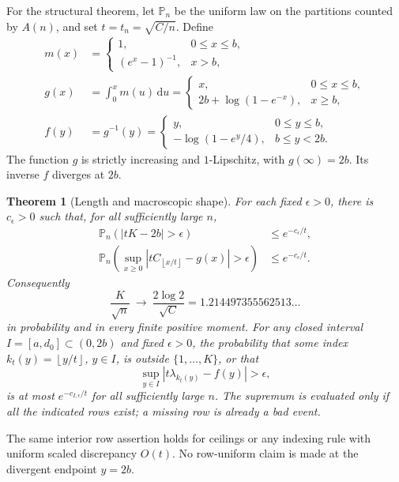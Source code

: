 \documentclass[11pt,letterpaper]{article}
\numberwithin{equation}{section}
\newtheorem{theorem}{Theorem}[section]
\theoremstyle{remark}\newtheorem{remark}[theorem]{Remark}
\newcommand{\PP}{\mathbb P}
\newcommand{\floor}[1]{\left\lfloor #1\right\rfloor}
\newcommand{\dd}{\,\mathrm d}
\begin{document}
For the structural theorem, let $\PP_n$ be the uniform law on the
partitions counted by $A(n)$, and set $t=t_n=\sqrt{C/n}$. Define
\begin{align}
 m(x)&=\begin{cases}1,&0\leq x\leq b,\\
 (e^x-1)^{-1},&x>b,\end{cases}\label{dgp:airy:eq:m}\\
 g(x)&=\int_0^x m(u)\dd u
 =\begin{cases}x,&0\leq x\leq b,\\
 2b+\log(1-e^{-x}),&x\geq b,\end{cases}\label{dgp:airy:eq:g}\\
 f(y)&=g^{-1}(y)
 =\begin{cases}y,&0\leq y\leq b,\\
 -\log(1-e^y/4),&b\leq y<2b.\end{cases}\label{dgp:airy:eq:f}
\end{align}
The function $g$ is strictly increasing and $1$-Lipschitz, with
$g(\infty)=2b$. Its inverse $f$ diverges at $2b$.

\begin{theorem}[Length and macroscopic shape]\label{dgp:airy:thm:shape}
For each fixed $\epsilon>0$, there is $c_\epsilon>0$ such that,
for all sufficiently large $n$,
\begin{align}
 \PP_n(|tK-2b|>\epsilon)&\leq e^{-c_\epsilon/t},\label{dgp:airy:eq:length}\\
 \PP_n\!\left(\sup_{x\geq0}
 |tC_{\floor{x/t}}-g(x)|>\epsilon\right)
 &\leq e^{-c_\epsilon/t}.\label{dgp:airy:eq:globalshape}
\end{align}
Consequently
\begin{equation}\label{dgp:airy:eq:lengthconstant}
 \frac K{\sqrt n}\ \longrightarrow\ \frac{2\log2}{\sqrt C}
       =1.214497355562513\ldots
\end{equation}
in probability and in every finite positive moment.
For any closed interval $I=[a,d_0]\subset(0,2b)$ and fixed
$\epsilon>0$, the probability that some index
$k_t(y)=\floor{y/t}$, $y\in I$, is outside $\{1,\ldots,K\}$,
or that
\[
 \sup_{y\in I}|t\lambda_{k_t(y)}-f(y)|>\epsilon,
\]
is at most $e^{-c_{I,\epsilon}/t}$ for all sufficiently large $n$.
The supremum is evaluated only if all the indicated rows exist;
a missing row is already a bad event.
\end{theorem}
The same interior row assertion holds for ceilings or any indexing
rule with uniform scaled discrepancy $O(t)$. No row-uniform claim is
made at the divergent endpoint $y=2b$.
\end{document}
